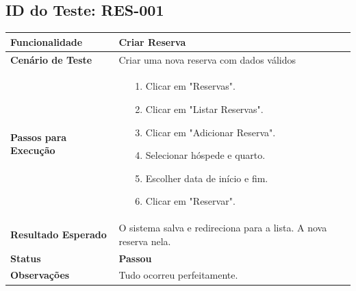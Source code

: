 \documentclass[
	12pt,				%
	openany,			%
	oneside,			%
	a4paper,			%
	english,			%
	french,				%
	spanish,			%
	brazil				%
	]{abntex2}
\begin{document}
\begin{apendicesenv}
\subsection*{ID do Teste: RES-001}
\begin{tabular}{@{} p{5cm} p{11cm} @{}}
	\toprule
	\textbf{Funcionalidade} & Criar Reserva \\
	\midrule
	\textbf{Cenário de Teste} & Criar uma nova reserva com dados válidos \\
	\midrule
	\textbf{Passos para Execução} & 
	\begin{itemize} \itemsep0em 
		\item[1.] Clicar em "Reservas".
		\item[2.] Clicar em "Listar Reservas".
		\item[3.] Clicar em "Adicionar Reserva".
		\item[4.] Selecionar hóspede e quarto.
		\item[5.] Escolher data de início e fim.
		\item[6.] Clicar em "Reservar".
	\end{itemize} \\
	\midrule
	\textbf{Resultado Esperado} & O sistema salva e redireciona para a lista. A nova reserva nela. \\
	\midrule
	\textbf{Status} & \textbf{Passou} \\
	\midrule
	\textbf{Observações} & Tudo ocorreu perfeitamente. \\
	\bottomrule
\end{tabular}
\vspace{1cm}


\end{apendicesenv}
\end{document}
